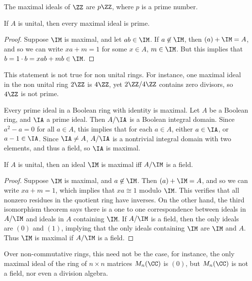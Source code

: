 \begin{example}
    The maximal ideals of $\ZZ$ are $p \ZZ$, where $p$ is a prime number.
\end{example}

\begin{theorem}
    If $A$ is unital, then every maximal ideal is prime.
\end{theorem}
\begin{proof}
    Suppose $\IM$ is maximal, and let $ab \in \IM$. If $a \not \in \IM$, then $(a) + \IM = A$, and so we can write $xa + m = 1$ for some $x \in A$, $m \in \IM$. But this implies that $b = 1 \cdot b = xab + mb \in \IM$.
\end{proof}

\begin{remark}
    This statement is not true for non unital rings. For instance, one maximal ideal in the non unital ring $2 \ZZ$ is $4\ZZ$, yet $2\ZZ / 4\ZZ$ contains zero divisors, so $4\ZZ$ is not prime.
\end{remark}

\begin{example}
    Every prime ideal in a Boolean ring with identity is maximal. Let $A$ be a Boolean ring, and $\IA$ a prime ideal. Then $A/\IA$ is a Boolean integral domain. Since $a^2 - a = 0$ for all $a \in A$, this implies that for each $a \in A$, either $a \in \IA$, or $a - 1 \in \IA$. Since $\IA \neq A$, $A/\IA$ is a nontrivial integral domain with two elements, and thus a field, so $\IA$ is maximal.
\end{example}

\begin{theorem}
    If $A$ is unital, then an ideal $\IM$ is maximal iff $A/\IM$ is a field.
\end{theorem}
\begin{proof}
    Suppose $\IM$ is maximal, and $a \not \in \IM$. Then $(a) + \IM = A$, and so we can write $xa + m = 1$, which implies that $xa \cong 1$ modulo $\IM$. This verifies that all nonzero residues in the quotient ring have inverses. On the other hand, the third isomorphism theorem says there is a one to one correspondence between ideals in $A/\IM$ and ideals in $A$ containing $\IM$. If $A/\IM$ is a field, then the only ideals are $(0)$ and $(1)$, implying that the only ideals containing $\IM$ are $\IM$ and $A$. Thus $\IM$ is maximal if $A/\IM$ is a field.
\end{proof}

Over non-commutative rings, this need not be the case, for instance, the only maximal ideal of the ring of $n \times n$ matrices $M_n(\CC)$ is $(0)$, but $M_n(\CC)$ is not a field, nor even a division algebra.

